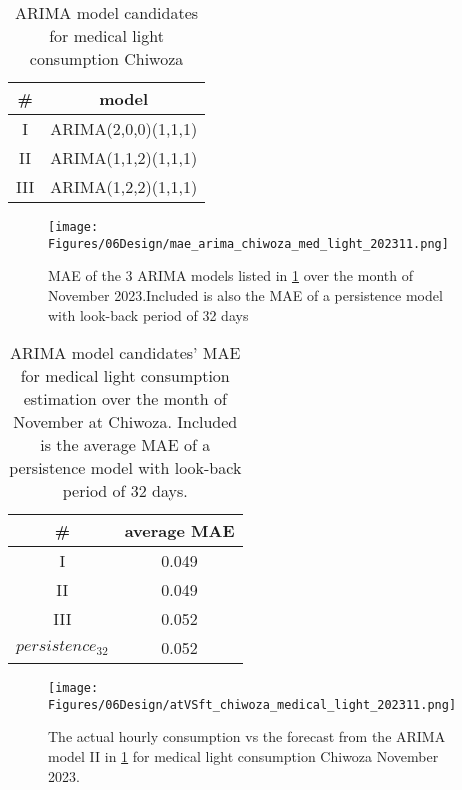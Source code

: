 \begin{table}[]
    \centering
    \begin{tabular}{c|c}
         \#& model \\
         \hline
         I& ARIMA(2,0,0)(1,1,1)\\
         II& ARIMA(1,1,2)(1,1,1)\\
         III& ARIMA(1,2,2)(1,1,1)\\
    \end{tabular}
    \caption[ARIMA candidates medical light consumption Chiwoza]{ARIMA model candidates for medical light consumption Chiwoza}
    \label{tab:arima_candidate_chiwoza_med_light}
\end{table}

\begin{figure}
    \centering
    \texttt{[image: Figures/06Design/mae\_arima\_chiwoza\_med\_light\_202311.png]}
    \caption[MAE ARIMA candidates medical light consumption Chiwoza]{MAE of the 3 ARIMA models listed in \ref{tab:arima_candidate_chiwoza_med_light} over the month of November 2023.Included is also the MAE of a persistence model with look-back period of 32 days}
    \label{fig:mae_arima_chiwoza_med_light_202311}
\end{figure}

\begin{table}[]
    \centering
    \begin{tabular}{c|c}
         \#& average MAE \\
         \hline
         I& 0.049\\
         II& 0.049\\
         III& 0.052\\
         $persistence_{32}$& 0.052\\
    \end{tabular}
    \caption[Average MAE ARIMA candidates and persistence model medical light consumption Chiwoza]{ARIMA model candidates' MAE for medical light consumption estimation over the month of November at Chiwoza. Included is the average MAE of a persistence model with look-back period of 32 days.}
    \label{tab:arima_candidate_mae_chiwoza_med_light}
\end{table}

\begin{figure}
    \centering
    \texttt{[image: Figures/06Design/atVSft\_chiwoza\_medical\_light\_202311.png]}
    \caption[Actual vs Forecasted consumption medical light consumption]{The actual hourly consumption vs the forecast from the ARIMA model II in \ref{tab:arima_candidate_chiwoza_med_light} for medical light consumption Chiwoza November 2023.}
    \label{fig:atVSft_chiwoza_medical_light_202311}
\end{figure}

